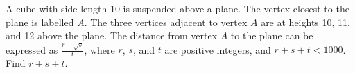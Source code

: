 A cube with side length 10 is suspended above a plane. The vertex closest to the plane is labelled $A$. The three vertices adjacent to vertex $A$ are at heights 10, 11, and 12 above the plane. The distance from vertex $A$ to the plane can be expressed as $\tfrac{r-\sqrt{s}}{t}$, where $r$, $s$, and $t$ are positive integers, and $r+s+t<1000$. Find $r+s+t$.